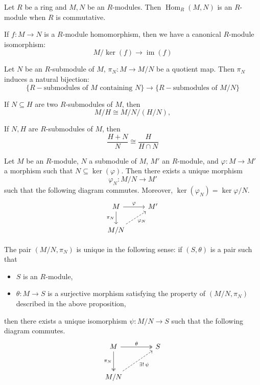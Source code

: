 \documentclass[11pt, a4paper]{report}
\begin{document}
\begin{example} 
Let $ R $ be a ring and $ M,N $ be an $ R $-modules. Then $ \operatorname{Hom}_R(M,N) $ is an $ R $-module when $ R $ is commutative.     
\end{example}

\begin{theorem} 
If $ f: M\to N $ is a $ R $-module homomorphism, then we have a canonical $ R $-module isomorphism:
\[
M/ \ker(f) \rightarrow \operatorname{im}(f)
\]   
\end{theorem}

\begin{theorem} 
Let $ N $ be an $ R $-submodule of $ M $, $ \pi_N: M \to M/N $ be a quotient map. Then $ \pi_N $ induces a natural bijection:
\[
\{R-\text{submodules of } M \text{ containing } N\} \rightarrow \{R-\text{submodules of } M/N\}
\]    
\end{theorem}

\begin{theorem} 
If $ N\subseteq H$ are two $ R $-submodules of $ M $, then 
\[
M/H \cong M/N / (H/N), 
\]
\end{theorem}

\begin{theorem} 
If $ N,H $ are $ R $-submodules of $ M $, then
\[
\frac{H+N}{N} \cong \frac{H}{H \cap N} 
\] 
\end{theorem} 

\begin{proposition}
Let $M$ be an $R$-module, $N$ a submodule of $M$, $M'$ an $R$-module, and $\varphi: M \rightarrow M'$ a morphism such that $N \subseteq \ker(\varphi)$. Then there exists a unique morphism
\[
\varphi_{N}: M/N \rightarrow M'
\]
such that the following diagram commutes. Moreover, $\ker(\varphi_{N}) = \ker\varphi / N$.
\[
\begin{tikzcd}
M \arrow[r, "\varphi"] \arrow[d, "\pi_{N}"'] & M' \\
M/N \arrow[ru, "\varphi_{N}"', dashed]
\end{tikzcd}
\]
\end{proposition}

\begin{remark}
The pair $(M/N, \pi_{N})$ is unique in the following sense: if $(S, \theta)$ is a pair such that
\begin{itemize}
\item $S$ is an $R$-module,
\item $\theta: M \rightarrow S$ is a surjective morphism satisfying the property of $(M/N, \pi_{N})$ described in the above proposition,
\end{itemize}
then there exists a unique isomorphism $\psi: M/N \rightarrow S$ such that the following diagram commutes.
\[
\begin{tikzcd}[row sep=2.8em, column sep=3.8em]
M \arrow[r, two heads, "\theta"] \arrow[d, two heads, "\pi_{N}"'] & S \\
M/N \arrow[ur, dashed, "\exists!\,\psi"'] &
\end{tikzcd}
\]
\end{remark}
\end{document}
